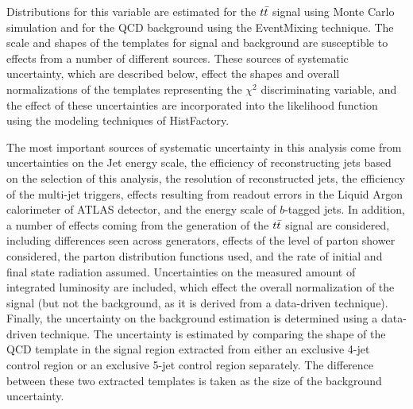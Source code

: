 Distributions for this variable are estimated for the $t\bar{t}$ signal using Monte Carlo simulation and for the QCD background using the EventMixing technique.
The scale and shapes of the templates for signal and background are susceptible to effects from a number of different sources.
These sources of systematic uncertainty, which are described below, effect the shapes and overall normalizations of the templates
representing the $\chi^2$ discriminating variable, and the effect of these uncertainties are incorporated into the likelihood
function using the modeling techniques of HistFactory.


The most important sources of systematic uncertainty in this analysis come from uncertainties on the Jet energy scale,
the efficiency of reconstructing jets based on the selection of this analysis, the resolution of reconstructed jets,
the efficiency of the multi-jet triggers, 
effects resulting from readout errors in the Liquid Argon calorimeter of ATLAS detector, 
and the energy scale of $b$-tagged jets.
In addition, a number of effects coming from the generation of the $t\bar{t}$ signal are considered, 
including differences seen across generators, effects of the level of parton shower considered, 
the parton distribution functions used,
and the rate of initial and final state radiation assumed.
Uncertainties on the measured amount of integrated luminosity are included, which effect the overall
normalization of the signal (but not the background, as it is derived from a data-driven technique).
Finally, the uncertainty on the background estimation is determined using a data-driven technique.
The uncertainty is estimated by comparing the shape of the QCD template in the signal region extracted
from either an exclusive 4-jet control region or an exclusive 5-jet control region separately.
The difference between these two extracted templates is taken as the size of the background uncertainty.


